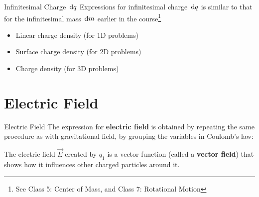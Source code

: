 \documentclass[12pt,aspectratio=169]{beamer}
\begin{document}
\begin{frame}{Infinitesimal Charge $\dl q$}
  Expressions for infinitesimal charge $\dl q$ is similar to that for the
  infinitesimal mass $\dl m$ earlier in the course\footnote{See Class 5: Center
  of Mass, and Class 7: Rotational Motion}
  \begin{itemize}
  \item Linear charge density (for 1D problems)


  \item\vspace{-.05in} Surface charge density (for 2D problems)


  \item\vspace{-.05in} Charge density (for 3D problems)

  \end{itemize}
\end{frame}

    

\section{Electric Field}

\begin{frame}{Electric Field}
  The expression for \textbf{electric field} is obtained by repeating the same
  procedure as with gravitational field, by grouping the variables in
  Coulomb's law:


  The electric field $\vec E$ created by $q_1$ is a vector function (called a
  \textbf{vector field}) that shows how it influences other charged particles
  around it.
\end{frame}
\end{document}
